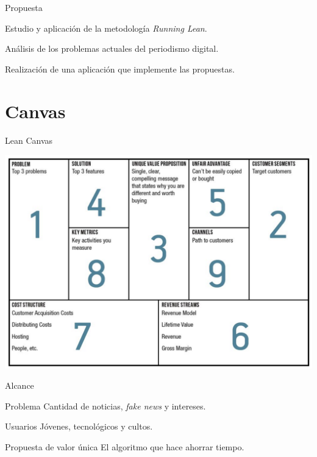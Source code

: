\documentclass[12pt]{beamer}
\begin{document}
		\begin{frame}{Propuesta}
			\begin{block}{}
				Estudio y aplicación de la metodología \textit{Running Lean}.
			\end{block}
			\begin{block}{}
				Análisis de los problemas actuales del periodismo digital.
			\end{block}
			\begin{block}{}
				Realización de una aplicación que implemente las propuestas.
			\end{block}
		\end{frame}
	
	
	\section{Canvas}
		\begin{frame}[label=canvas]{Lean Canvas}
			\begin{center}
				\includegraphics[width=\textwidth,height=0.8\textheight,keepaspectratio]{img/canvas/canvas}
			\end{center}
		\end{frame}

		\begin{frame}{Alcance}
			\begin{block}{Problema}
				Cantidad de noticias, \textit{fake news} y intereses.
			\end{block}
			\begin{block}{Usuarios}
				Jóvenes, tecnológicos y cultos.
			\end{block}
			\begin{block}{Propuesta de valor única}
				El algoritmo que hace ahorrar tiempo.
			\end{block}
		\end{frame}
		
\end{document}
